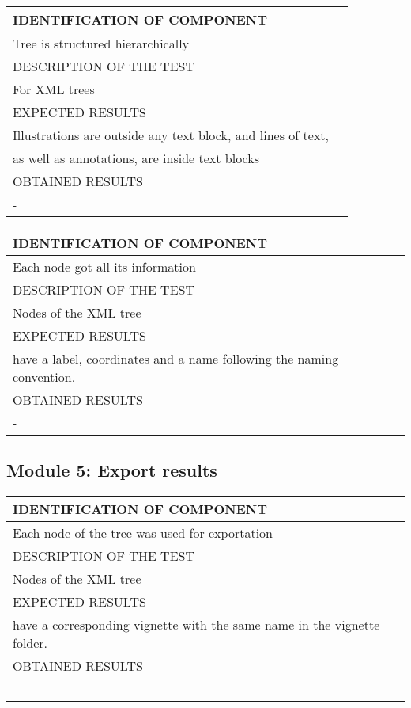 \documentclass{polytech/polytech}
\numberwithin{figure}{chapter}
\begin{document}
\begin{appendix}
\begin{table}[]
\begin{tabular}{|l|l|}\hline
\color{C} IDENTIFICATION OF COMPONENT \\\hline
Tree is structured hierarchically  \\\hline
\color{C} DESCRIPTION OF THE TEST\\\hline
For XML trees    \\\hline
\color{C} EXPECTED RESULTS \\\hline
Illustrations are outside any text block, and lines of text,\\ as well as annotations, are inside text blocks \\\hline
\color{C} OBTAINED RESULTS \\\hline
- \\\hline
\end{tabular}
\end{table}

\begin{table}[]
\begin{tabular}{|l|l|}\hline
\color{C} IDENTIFICATION OF COMPONENT \\\hline
Each node got all its information  \\\hline
\color{C} DESCRIPTION OF THE TEST\\\hline
Nodes of the XML tree     \\\hline
\color{C} EXPECTED RESULTS \\\hline
have a label, coordinates and a name following the naming convention. \\\hline
\color{C} OBTAINED RESULTS \\\hline
- \\\hline
\end{tabular}
\end{table}

\subsection{Module 5: Export results}

\begin{table}[]
\begin{tabular}{|l|l|}\hline
\color{C} IDENTIFICATION OF COMPONENT \\\hline
Each node of the tree was used for exportation  \\\hline
\color{C} DESCRIPTION OF THE TEST\\\hline
Nodes of the XML tree     \\\hline
\color{C} EXPECTED RESULTS \\\hline
have a corresponding vignette with the same name in the vignette folder. \\\hline
\color{C} OBTAINED RESULTS \\\hline
- \\\hline
\end{tabular}
\end{table}


\end{appendix}
\end{document}
